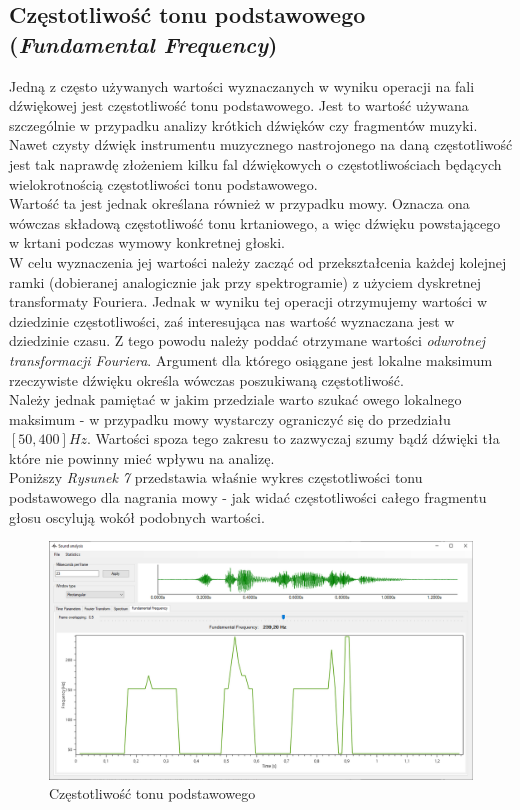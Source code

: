 \documentclass[a4paper]{article}
\begin{document}
\subsection{Częstotliwość tonu podstawowego (\textit{Fundamental Frequency})}
Jedną z często używanych wartości wyznaczanych w wyniku operacji na fali dźwiękowej jest częstotliwość tonu podstawowego. Jest to wartość używana szczególnie w przypadku analizy krótkich dźwięków czy fragmentów muzyki. Nawet czysty dźwięk instrumentu muzycznego nastrojonego na daną częstotliwość jest tak naprawdę złożeniem kilku fal dźwiękowych o częstotliwościach będących wielokrotnością częstotliwości tonu podstawowego.\\
Wartość ta jest jednak określana również w przypadku mowy. Oznacza ona wówczas składową częstotliwość tonu krtaniowego, a więc dźwięku powstającego w krtani podczas wymowy konkretnej głoski.\\
W celu wyznaczenia jej wartości należy zacząć od przekształcenia każdej kolejnej ramki (dobieranej analogicznie jak przy spektrogramie) z użyciem dyskretnej transformaty Fouriera. Jednak w wyniku tej operacji otrzymujemy wartości w dziedzinie częstotliwości, zaś interesująca nas wartość wyznaczana jest w dziedzinie czasu. Z tego powodu należy poddać otrzymane wartości \textit{odwrotnej transformacji Fouriera}. Argument dla którego osiągane jest lokalne maksimum rzeczywiste dźwięku określa wówczas poszukiwaną częstotliwość.\\
Należy jednak pamiętać w jakim przedziale warto szukać owego lokalnego maksimum - w przypadku mowy wystarczy ograniczyć się do przedziału $[50, 400] Hz$. Wartości spoza tego zakresu to zazwyczaj szumy bądź dźwięki tła które nie powinny mieć wpływu na analizę.\\
Poniższy \textit{Rysunek 7} przedstawia właśnie wykres częstotliwości tonu podstawowego dla nagrania mowy - jak widać częstotliwości całego fragmentu głosu oscylują wokół podobnych wartości.
\begin{figure}[H]
  \includegraphics[width=\linewidth]{images/07fundamentalFrequency.png}
  \caption{Częstotliwość tonu podstawowego}
\end{figure}
\end{document}

